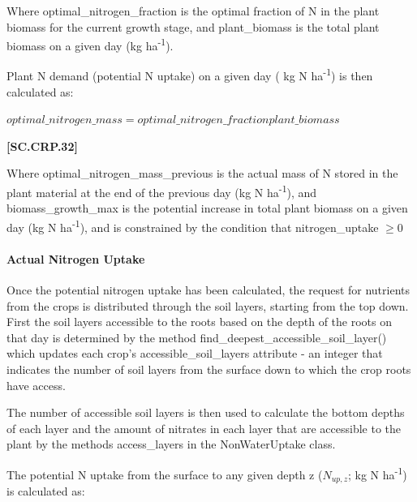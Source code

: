Where optimal\_nitrogen\_fraction is the optimal fraction of N in the plant biomass for the current growth stage, and plant\_biomass is the total plant biomass on a given day (kg ha\textsuperscript{-1}).

Plant N demand (potential N uptake) on a given day ( kg N ha\textsuperscript{-1}) is then calculated as:
    \vspace{0.2cm}

    \begin{center}
        \(optimal\_nitrogen\_mass=optimal\_nitrogen\_fractionplant\_biomass\)
    \end{center}
        \vspace{0.5cm}
    
            {\raggedleft \textbf{[SC.CRP.32]}\par}
            \vspace{0.5cm}



Where optimal\_nitrogen\_mass\_previous is the actual mass of N stored in the plant material at the end of the previous day (kg N ha\textsuperscript{-1}), and biomass\_growth\_max is the potential increase in total plant biomass on a given day (kg N ha\textsuperscript{-1}), and is constrained by the condition that nitrogen\_uptake \(\geq 0\)


\paragraph{Actual Nitrogen Uptake}
\vspace{-0.25cm}

Once the potential nitrogen uptake has been calculated, the request for nutrients from the crops is distributed through the soil layers, starting from the top down. First the soil layers accessible to the roots based on the depth of the roots on that day is determined by the method find\_deepest\_accessible\_soil\_layer() which updates each crop’s accessible\_soil\_layers attribute - an integer that indicates the number of soil layers from the surface down to which the crop roots have access. 

The number of accessible soil layers is then used to calculate the bottom depths of each layer and the amount of nitrates in each layer that are accessible to the plant by the methods access\_layers in the NonWaterUptake class.

The potential N uptake from the surface to any given depth z (\(N_{up,z}\); kg N ha\textsuperscript{-1}) is calculated as:
    \vspace{0.2cm}

